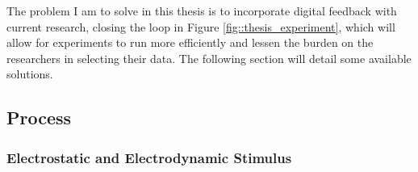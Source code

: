 The problem I am to solve in this thesis is to incorporate digital feedback with current research, closing the loop in Figure \ref{fig::thesis_experiment}, which will allow for experiments to run more efficiently and lessen the burden on the researchers in selecting their data. The following section will detail some available solutions.

\subsection{Process}

	\subsubsection{Electrostatic and Electrodynamic Stimulus}
